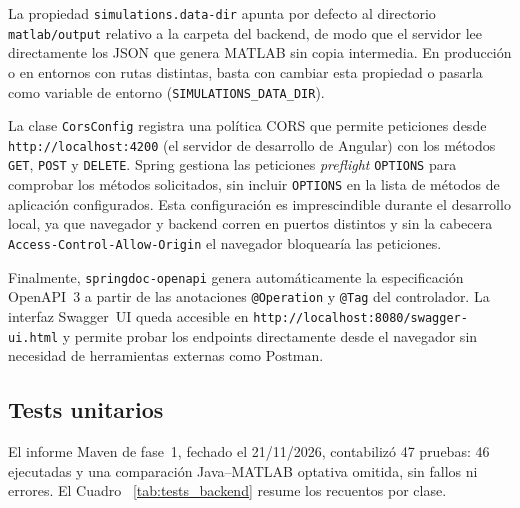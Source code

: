 La propiedad \texttt{simulations.data-dir} apunta por defecto al directorio
\texttt{matlab/output} relativo a la carpeta del backend, de modo que el servidor
lee directamente los JSON que genera MATLAB sin copia intermedia. En producción o en
entornos con rutas distintas, basta con cambiar esta propiedad o pasarla como variable
de entorno (\texttt{SIMULATIONS\_DATA\_DIR}).

La clase \texttt{CorsConfig} registra una política CORS que permite peticiones desde
\texttt{http://localhost:4200} (el servidor de desarrollo de Angular) con los métodos
\texttt{GET}, \texttt{POST} y \texttt{DELETE}. Spring gestiona las peticiones
\textit{preflight} \texttt{OPTIONS} para comprobar los métodos solicitados, sin incluir
\texttt{OPTIONS} en la lista de métodos de aplicación configurados. Esta configuración es imprescindible durante el
desarrollo local, ya que navegador y backend corren en puertos distintos y sin la
cabecera \texttt{Access-Control-Allow-Origin} el navegador bloquearía las peticiones.

Finalmente, \texttt{springdoc-openapi} genera automáticamente la especificación
OpenAPI~3 a partir de las anotaciones \texttt{@Operation} y \texttt{@Tag} del
controlador. La interfaz Swagger~UI queda accesible en
\texttt{http://localhost:8080/swagger-ui.html} y permite probar los endpoints
directamente desde el navegador sin necesidad de herramientas externas como Postman.

\subsection{Tests unitarios}
\label{sec:backend_tests}

El informe Maven de fase~1, fechado el 21/11/2026, contabilizó 47 pruebas: 46 ejecutadas y
una comparación Java--MATLAB optativa omitida, sin fallos ni errores. El Cuadro~
\ref{tab:tests_backend} resume los recuentos por clase.

